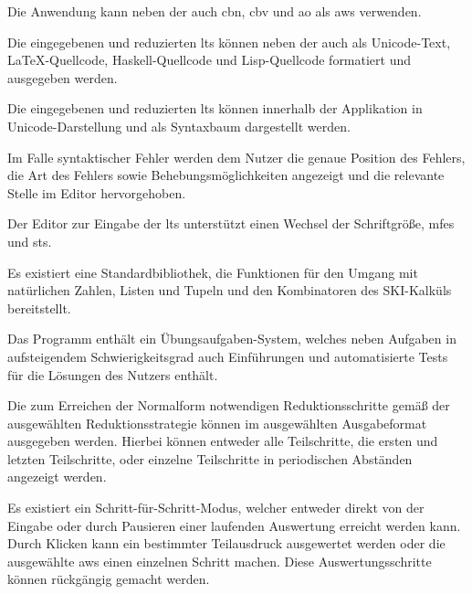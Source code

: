 \documentclass[parskip=full,11pt,twoside]{scrartcl}
\begin{document}

Die Anwendung kann neben der  auch \gls{cbn}, \gls{cbv}
und \gls{ao} als \gls{aws} verwenden.

Die eingegebenen und reduzierten \glspl{lt} können neben der 
auch als Unicode-Text, \LaTeX-Quellcode, Haskell-Quellcode und Lisp-Quellcode formatiert und ausgegeben
werden.

Die eingegebenen und reduzierten \glspl{lt} können innerhalb der Applikation in Unicode-Darstellung und als Syntaxbaum
dargestellt werden.

Im Falle syntaktischer Fehler werden dem Nutzer die genaue Position des Fehlers, die
Art des Fehlers sowie Behebungsmöglichkeiten angezeigt und die relevante Stelle im
Editor hervorgehoben.

Der Editor zur Eingabe der \glspl{lt} unterstützt einen Wechsel der Schriftgröße,
\glspl{mfe} und \glspl{st}.

Es existiert eine Standardbibliothek, die Funktionen für den Umgang mit natürlichen
Zahlen, Listen und Tupeln und den Kombinatoren des SKI-Kalküls bereitstellt.

Das Programm enthält ein Übungsaufgaben-System, welches neben Aufgaben in aufsteigendem
Schwierigkeitsgrad auch Einführungen und automatisierte Tests für die Lösungen des Nutzers
enthält.

Die zum Erreichen der Normalform notwendigen Reduktionsschritte gemäß der ausgewählten
Reduktionsstrategie können im ausgewählten Ausgabeformat ausgegeben werden. Hierbei
können entweder alle Teilschritte, die ersten und letzten Teilschritte, oder
einzelne Teilschritte in periodischen Abständen angezeigt werden.

Es existiert ein Schritt-für-Schritt-Modus, welcher entweder direkt von der Eingabe
oder durch Pausieren einer laufenden Auswertung erreicht werden kann.
Durch Klicken kann ein bestimmter Teilausdruck ausgewertet werden oder die ausgewählte
\gls{aws} einen einzelnen Schritt machen. Diese Auswertungsschritte können rückgängig
gemacht werden.
\end{document}
